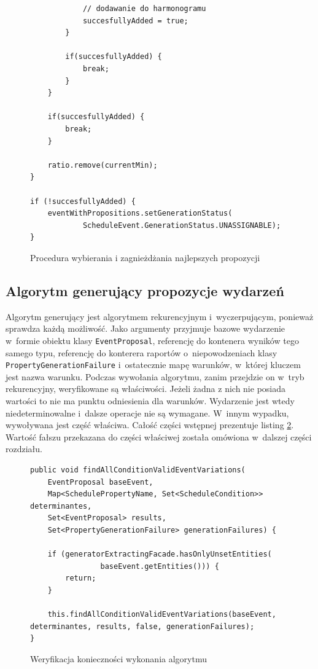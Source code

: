 \documentclass[a4paper]{book}
\begin{document}
{\begin{figure}
\begin{lstlisting}
			// dodawanie do harmonogramu
			succesfullyAdded = true;
		}
		
		if(succesfullyAdded) {
			break;
		}
	}
	
	if(succesfullyAdded) {
		break;
	}
	
	ratio.remove(currentMin);
}

if (!succesfullyAdded) {
	eventWithPropositions.setGenerationStatus(
			ScheduleEvent.GenerationStatus.UNASSIGNABLE);
}
\end{lstlisting}
\caption{Procedura wybierania i zagnieżdżania najlepszych propozycji}
\label{id:fig:listing:autogeneration2}
\end{figure}




\subsection{Algorytm generujący propozycje wydarzeń}
\label{rekurencyjny}

Algorytm generujący jest algorytmem rekurencyjnym i~wyczerpującym, ponieważ sprawdza każdą możliwość. Jako argumenty przyjmuje bazowe wydarzenie w~formie obiektu klasy \lstinline|EventProposal|, referencję do kontenera wyników tego samego typu, referencję do konterera raportów o~niepowodzeniach klasy \lstinline|PropertyGenerationFailure| i~ostatecznie mapę warunków, w~której kluczem jest nazwa warunku. Podczas wywołania algorytmu, zanim przejdzie on w~tryb rekurencyjny, weryfikowane są właściwości. Jeżeli żadna z nich nie posiada wartości to nie ma punktu odniesienia dla warunków. Wydarzenie jest wtedy niedeterminowalne i~dalsze operacje nie są wymagane. W~innym wypadku, wywoływana jest część właściwa. Całość części wstępnej prezentuje listing \ref{id:fig:listing:b4Recursion}. Wartość fałszu przekazana do części właściwej została omówiona w~dalszej części rozdziału.
\begin{figure}
\begin{lstlisting}
public void findAllConditionValidEventVariations(
	EventProposal baseEvent,
	Map<SchedulePropertyName, Set<ScheduleCondition>> determinantes,
	Set<EventProposal> results,
	Set<PropertyGenerationFailure> generationFailures) {
	
	if (generatorExtractingFacade.hasOnlyUnsetEntities(
				baseEvent.getEntities())) {
		return;
	}
	
	this.findAllConditionValidEventVariations(baseEvent, determinantes, results, false, generationFailures);
}
\end{lstlisting}
\caption{Weryfikacja konieczności wykonania algorytmu}
\label{id:fig:listing:b4Recursion}
\end{figure}

}
\end{document}
